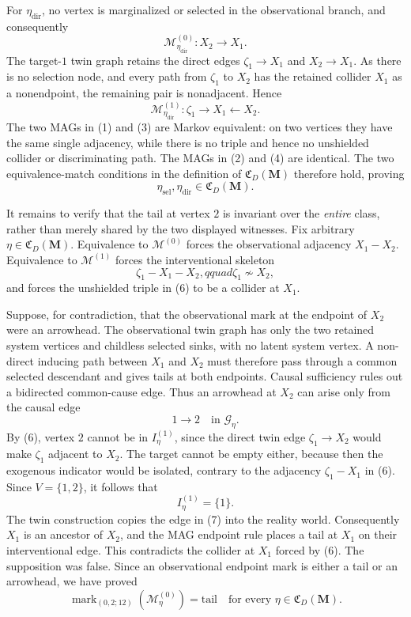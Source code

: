 For \(\eta_{\mathrm{dir}}\), no vertex is marginalized or selected in the observational branch, and consequently
\[
 \mathcal M_{\eta_{\mathrm{dir}}}^{(0)}:
 X_2\longrightarrow X_1. \tag{3}
\]
The target-\(1\) twin graph retains the direct edges \(\zeta_1\to X_1\) and \(X_2\to X_1\).  As there is no selection node, and every path from \(\zeta_1\) to \(X_2\) has the retained collider \(X_1\) as a nonendpoint, the remaining pair is nonadjacent.  Hence
\[
 \mathcal M_{\eta_{\mathrm{dir}}}^{(1)}:
 \zeta_1\longrightarrow X_1\longleftarrow X_2. \tag{4}
\]
The two MAGs in (1) and (3) are Markov equivalent: on two vertices they have the same single adjacency, while there is no triple and hence no unshielded collider or discriminating path.  The MAGs in (2) and (4) are identical.  The two equivalence-match conditions in the definition of \(\mathfrak C_D(\mathbf M)\) therefore hold, proving
\[
 \eta_{\mathrm{sel}},\eta_{\mathrm{dir}}
 \in\mathfrak C_D(\mathbf M). \tag{5}
\]

It remains to verify that the tail at vertex \(2\) is invariant over the \emph{entire} class, rather than merely shared by the two displayed witnesses.  Fix arbitrary \(\eta\in\mathfrak C_D(\mathbf M)\).  Equivalence to \(\mathcal M^{(0)}\) forces the observational adjacency \(X_1-X_2\).  Equivalence to \(\mathcal M^{(1)}\) forces the interventional skeleton
\[
 \zeta_1-X_1-X_2,qquad \zeta_1\not\sim X_2, \tag{6}
\]
and forces the unshielded triple in (6) to be a collider at \(X_1\).

Suppose, for contradiction, that the observational mark at the endpoint of \(X_2\) were an arrowhead.  The observational twin graph has only the two retained system vertices and childless selected sinks, with no latent system vertex.  A non-direct inducing path between \(X_1\) and \(X_2\) must therefore pass through a common selected descendant and gives tails at both endpoints.  Causal sufficiency rules out a bidirected common-cause edge.  Thus an arrowhead at \(X_2\) can arise only from the causal edge
\[
 1\longrightarrow2\quad\text{in }\mathcal G_\eta. \tag{7}
\]
By (6), vertex \(2\) cannot be in \(I_\eta^{(1)}\), since the direct twin edge \(\zeta_1\to X_2\) would make \(\zeta_1\) adjacent to \(X_2\).  The target cannot be empty either, because then the exogenous indicator would be isolated, contrary to the adjacency \(\zeta_1-X_1\) in (6).  Since \(V=\{1,2\}\), it follows that
\[
 I_\eta^{(1)}=\{1\}. \tag{8}
\]
The twin construction copies the edge in (7) into the reality world.  Consequently \(X_1\) is an ancestor of \(X_2\), and the MAG endpoint rule places a tail at \(X_1\) on their interventional edge.  This contradicts the collider at \(X_1\) forced by (6).  The supposition was false.  Since an observational endpoint mark is either a tail or an arrowhead, we have proved
\[
 \operatorname{mark}_{(0,2;12)}
   (\mathcal M_\eta^{(0)})=\mathrm{tail}
 \quad\text{for every }\eta\in\mathfrak C_D(\mathbf M). \tag{9}
\]

